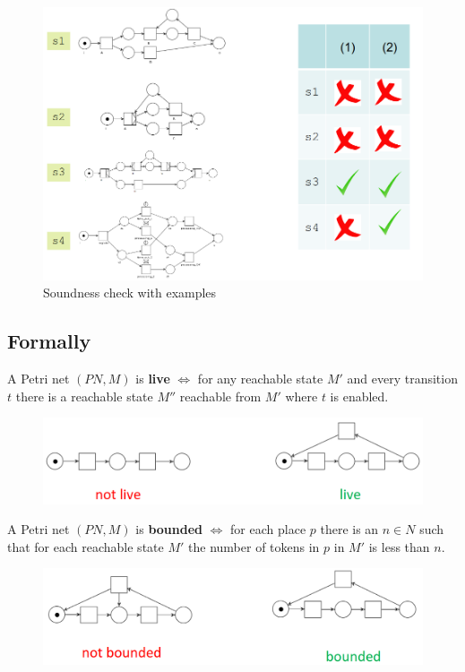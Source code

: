 \begin{figure}[htbp]
   \centering
   \includegraphics{images/wfnet_sound.png}
   \caption{Soundness check with examples}
   \label{fig:wfnet_sound}
\end{figure}

\subsection{Formally}
A Petri net $(PN,M)$ is \textbf{live} $\Longleftrightarrow$ for any reachable state $M'$ and every transition $t$ there is a reachable state $M''$ reachable from $M'$ where $t$ is enabled.

\begin{figure}[htbp]
   \centering
   \includegraphics{images/wfnet_liveness.png}
   \label{fig:wfnet_liveness}
\end{figure}

A Petri net $(PN,M)$ is \textbf{bounded} $\Longleftrightarrow$ for each place $p$ there is an $n \in N$ such that for each reachable state $M'$ the number of tokens in $p$ in $M'$ is less than $n$.

\begin{figure}[htbp]
   \centering
   \includegraphics{images/wfnet_bounded.png}
   \label{fig:wfnet_bounded}
\end{figure}
